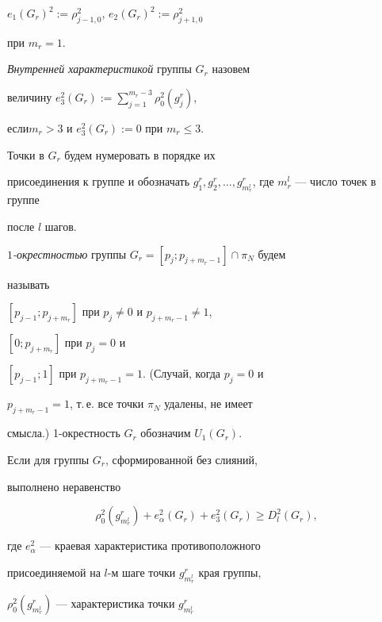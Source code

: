 $e_1(G_r)^2:=\rho_{j-1,0}^2$, $e_2(G_r)^2:=\rho_{j+1,0}^2$


при $m_r=1$.





{\it Внутренней характеристикой } группы $G_r$ назовем


величину $e_3^2(G_r):=\sum\limits_{j=1}^{m_r-3}\rho_0^2(g_j^r)$,


если\linebreak $m_r>3$ и $e_3^2(G_r):=0$ при $m_r\leq 3$.





Точки в $G_r$ будем нумеровать в порядке их


присоединения к группе и обозначать  $g_1^r,


g_2^r,\dotsc,g_{m_r^l}^r$, где $m_r^l$ --- число точек в группе


после $l$ шагов.





{\it $1$-окрестностью} группы $G_r=[p_j;p_{j+m_r-1}]\cap \pi_N$ будем


называть


$[p_{j-1};p_{j+m_r}]$ при $p_j\neq 0$ и $p_{j+m_r-1}\neq 1$,


$[0;p_{j+m_r}]$ при $p_j= 0$ и


$[p_{j-1};1]$ при $p_{j+m_r-1}=1$. (Случай, когда $p_j= 0$ и


$p_{j+m_r-1}=1$, т.\,е. все точки $\pi_N$ удалены, не имеет


смысла.)  1-окрестность $G_r$ обозначим $U_1(G_r)$.





Если для группы $G_r$, сформированной без слияний,


выполнено неравенство


\begin{equation}


\rho_{0}^2(g_{m_r^l}^r)+e_{\alpha}^2(G_r)+e_3^2(G_r)\geq


D_l^2(G_r),\label {01}


\end{equation}


где $e_{\alpha}^2$ --- краевая характеристика противоположного


присоединяемой на $l$-м шаге точки $g_{m_r^l}^r$ края группы,


$\rho_0^2(g_{m_r^l}^r)$ --- характеристика точки $g_{m_r^l}^r$


